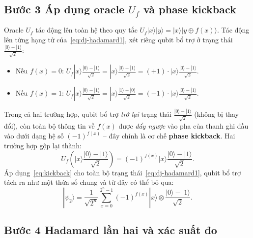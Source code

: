 \subsection*{Bước 3 \quad Áp dụng oracle $U_f$ và phase kickback}
 
Oracle $U_f$ tác động lên toàn hệ theo quy tắc
$U_f|x\rangle|y\rangle = |x\rangle|y \oplus f(x)\rangle$. Tác động lên từng hạng tử của~\eqref{eq:dj-hadamard1},
xét riêng qubit bổ trợ ở trạng thái $\frac{|0\rangle-|1\rangle}{\sqrt{2}}$:
 
\begin{itemize}
    \item Nếu $f(x) = 0$: $U_f|x\rangle\frac{|0\rangle-|1\rangle}{\sqrt{2}}
          = |x\rangle\frac{|0\rangle-|1\rangle}{\sqrt{2}}
          = (+1)\cdot|x\rangle\frac{|0\rangle-|1\rangle}{\sqrt{2}}.$
    \item Nếu $f(x) = 1$: $U_f|x\rangle\frac{|0\rangle-|1\rangle}{\sqrt{2}}
          = |x\rangle\frac{|1\rangle-|0\rangle}{\sqrt{2}}
          = (-1)\cdot|x\rangle\frac{|0\rangle-|1\rangle}{\sqrt{2}}.$
\end{itemize}
 
Trong cả hai trường hợp, qubit bổ trợ \emph{trở lại} trạng thái
$\frac{|0\rangle-|1\rangle}{\sqrt{2}}$ (không bị thay đổi), còn toàn bộ thông
tin về $f(x)$ được \emph{đẩy ngược} vào pha của thanh ghi đầu vào dưới dạng
hệ số $(-1)^{f(x)}$ -- đây chính là cơ chế \textbf{phase kickback}. Hai trường
hợp gộp lại thành:
\begin{equation}
    U_f\left(|x\rangle\frac{|0\rangle-|1\rangle}{\sqrt{2}}\right)
    = (-1)^{f(x)}|x\rangle\frac{|0\rangle-|1\rangle}{\sqrt{2}}.
    \label{eq:kickback}
\end{equation}
Áp dụng~\eqref{eq:kickback} cho toàn bộ trạng thái~\eqref{eq:dj-hadamard1},
qubit bổ trợ tách ra như một thừa số chung và từ đây có thể bỏ qua:
\begin{equation}
    |\psi_2\rangle
    = \frac{1}{\sqrt{2^n}}\sum_{x=0}^{2^n-1}(-1)^{f(x)}|x\rangle
      \otimes \frac{|0\rangle-|1\rangle}{\sqrt{2}}.
    \label{eq:dj-after-oracle}
\end{equation}
 
\subsection*{Bước 4 \quad Hadamard lần hai và xác suất đo}
 
